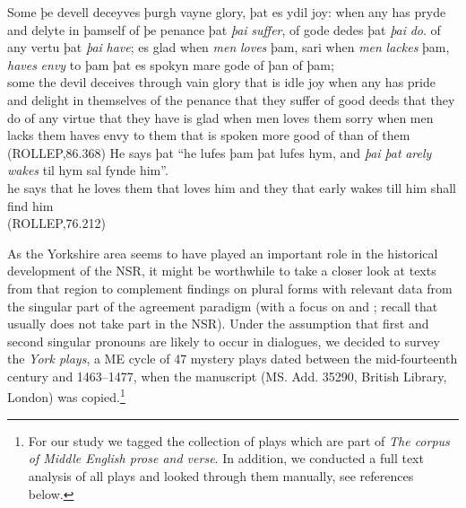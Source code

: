 \documentclass[output=paper]{langsci/langscibook}
\begin{document}
\ea
\ea
\gll Some þe devell deceyves þurgh vayne glory, þat es ydil joy: when any has pryde and delyte in þamself of þe penance þat \textit{þai} \textit{suffer}, of gode dedes þat \textit{þai} \textit{do}. of any vertu 	þat \textit{þai} \textit{have}; es glad when \textit{men} \textit{loves} þam, sari when \textit{men} \textit{lackes} þam, \textit{haves} \textit{envy} to þam þat es spokyn mare gode of þan of þam;\\
some the devil deceives through vain glory that is idle joy when any has pride and delight in themselves of the penance that they suffer of good deeds that they do of any virtue that they have is glad when men loves them sorry when men lacks them haves envy to them that is spoken more good of than of them\\
\glt (ROLLEP,86.368)
\ex
\gll He says þat ``he lufes þam þat lufes hym, and \textit{þai} \textit{þat} \textit{arely} \textit{wakes} til hym sal fynde him''. \\
he says that he loves them that loves him and they that early wakes till him shall find him\\
\glt (ROLLEP,76.212)
\z
\z

As the Yorkshire area seems to have played an important role in the historical
development of the \gls{NSR}, it might be worthwhile to take a closer look at
texts from that region to complement 
findings on plural forms with relevant data from the singular part of the
agreement paradigm (with a focus on \Fsg{} and \Ssg{}; recall that \Tsg{}
usually does not take part in the \gls{NSR}). Under the assumption that first
and second singular pronouns are likely to occur in dialogues, we decided to
survey the \emph{York plays}, a \gls{ME} cycle of 47 mystery plays dated between the
mid-fourteenth century and 1463--1477, when the manuscript (MS. Add. 35290,
British Library, London) was copied.\footnote{For our study we tagged the
    collection of plays which are part of \emph{The corpus of Middle English prose
    and verse}. In addition, we conducted a full text analysis of all plays and
looked through them manually, see references below.}
\end{document}

